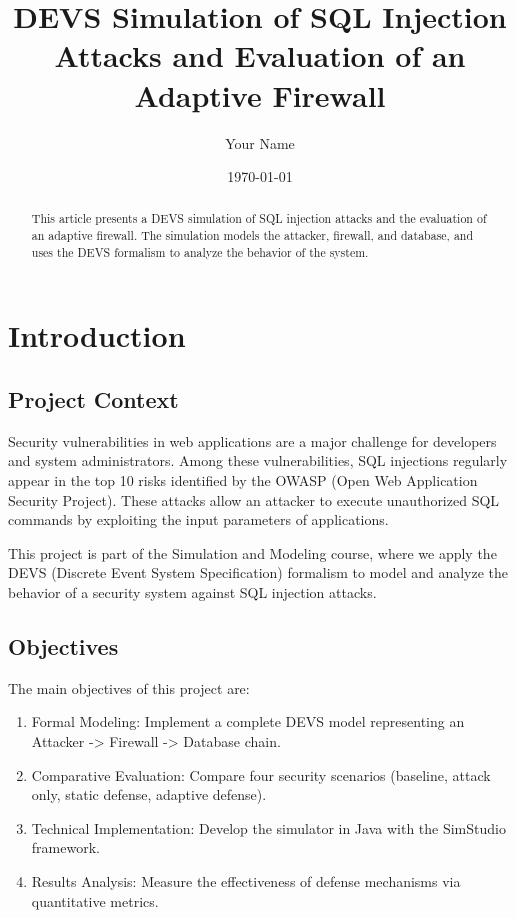 \documentclass{article}
\title{DEVS Simulation of SQL Injection Attacks and Evaluation of an Adaptive Firewall}
\author{Your Name}
\date{\today}
\begin{document}
\maketitle

\begin{abstract}
This article presents a DEVS simulation of SQL injection attacks and the evaluation of an adaptive firewall. The simulation models the attacker, firewall, and database, and uses the DEVS formalism to analyze the behavior of the system.
\end{abstract}

\section{Introduction}
\subsection{Project Context}
Security vulnerabilities in web applications are a major challenge for developers and system administrators. Among these vulnerabilities, SQL injections regularly appear in the top 10 risks identified by the OWASP (Open Web Application Security Project). These attacks allow an attacker to execute unauthorized SQL commands by exploiting the input parameters of applications.

This project is part of the Simulation and Modeling course, where we apply the DEVS (Discrete Event System Specification) formalism to model and analyze the behavior of a security system against SQL injection attacks.

\subsection{Objectives}
The main objectives of this project are:
\begin{enumerate}
    \item Formal Modeling: Implement a complete DEVS model representing an Attacker -> Firewall -> Database chain.
    \item Comparative Evaluation: Compare four security scenarios (baseline, attack only, static defense, adaptive defense).
    \item Technical Implementation: Develop the simulator in Java with the SimStudio framework.
    \item Results Analysis: Measure the effectiveness of defense mechanisms via quantitative metrics.
\end{enumerate}
\end{document}
